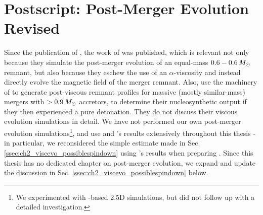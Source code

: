 \section{Postscript: Post-Merger Evolution Revised}
\label{sec:postscript_pme}

Since the publication of \citeal{zhu+13}, the work of \cite{ji+13} was published, which is relevant not only because they simulate the post-merger evolution of an equal-mass $0.6-0.6\,\Msun$ remnant, but also because they eschew the use of an $\alpha$-viscosity and instead directly evolve the magnetic field of the merger remnant.  Also, \cite{rask+14} use the machinery of \cite{schw+12} to generate post-viscous remnant profiles for massive (mostly similar-mass) mergers with $>0.9\,\Msun$ accretors, to determine their nucleosynthetic output if they then experienced a pure detonation.  They do not discuss their viscous evolution simulations in detail.  We have not performed our own post-merger evolution simulations\footnote{We experimented with \flash-based 2.5D simulations, but did not follow up with a detailed investigation.}, and use \cite{schw+12} and \cite{ji+13}'s results extensively throughout this thesis - in particular, we reconsidered the simple estimate made in Sec. \ref{ssec:ch2_viscevo_possiblespindown} using \cite{ji+13}'s results when preparing \citeal{zhu+16}.  Since this thesis has no dedicated chapter on post-merger evolution, we expand and update the discussion in Sec. \ref{ssec:ch2_viscevo_possiblespindown} below.


